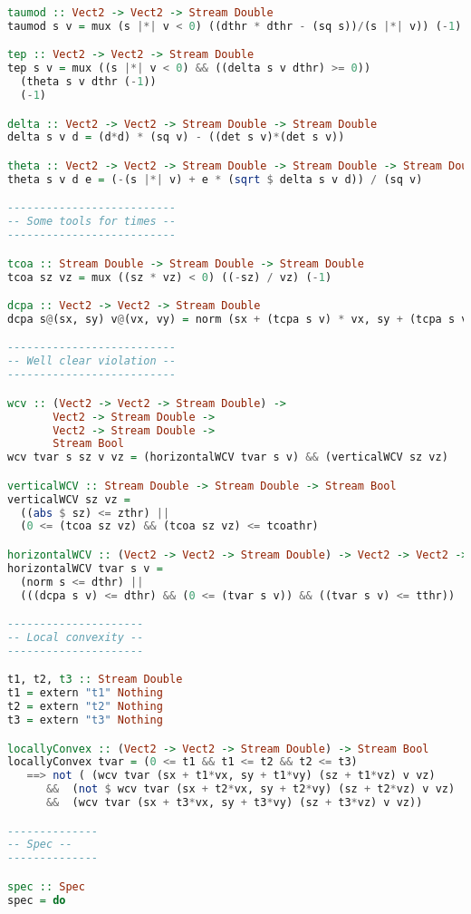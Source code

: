 {\begin{lstlisting}[language=Haskell]
taumod :: Vect2 -> Vect2 -> Stream Double
taumod s v = mux (s |*| v < 0) ((dthr * dthr - (sq s))/(s |*| v)) (-1)

tep :: Vect2 -> Vect2 -> Stream Double
tep s v = mux ((s |*| v < 0) && ((delta s v dthr) >= 0))
  (theta s v dthr (-1))
  (-1)

delta :: Vect2 -> Vect2 -> Stream Double -> Stream Double
delta s v d = (d*d) * (sq v) - ((det s v)*(det s v))

theta :: Vect2 -> Vect2 -> Stream Double -> Stream Double -> Stream Double
theta s v d e = (-(s |*| v) + e * (sqrt $ delta s v d)) / (sq v)

--------------------------
-- Some tools for times --
--------------------------

tcoa :: Stream Double -> Stream Double -> Stream Double
tcoa sz vz = mux ((sz * vz) < 0) ((-sz) / vz) (-1)

dcpa :: Vect2 -> Vect2 -> Stream Double
dcpa s@(sx, sy) v@(vx, vy) = norm (sx + (tcpa s v) * vx, sy + (tcpa s v) * vy)

--------------------------
-- Well clear violation --
--------------------------

wcv :: (Vect2 -> Vect2 -> Stream Double) ->
       Vect2 -> Stream Double ->
       Vect2 -> Stream Double ->
       Stream Bool
wcv tvar s sz v vz = (horizontalWCV tvar s v) && (verticalWCV sz vz)

verticalWCV :: Stream Double -> Stream Double -> Stream Bool
verticalWCV sz vz =
  ((abs $ sz) <= zthr) ||
  (0 <= (tcoa sz vz) && (tcoa sz vz) <= tcoathr)

horizontalWCV :: (Vect2 -> Vect2 -> Stream Double) -> Vect2 -> Vect2 -> Stream Bool
horizontalWCV tvar s v =
  (norm s <= dthr) ||
  (((dcpa s v) <= dthr) && (0 <= (tvar s v)) && ((tvar s v) <= tthr))

---------------------
-- Local convexity --
---------------------

t1, t2, t3 :: Stream Double
t1 = extern "t1" Nothing
t2 = extern "t2" Nothing
t3 = extern "t3" Nothing

locallyConvex :: (Vect2 -> Vect2 -> Stream Double) -> Stream Bool
locallyConvex tvar = (0 <= t1 && t1 <= t2 && t2 <= t3)
   ==> not ( (wcv tvar (sx + t1*vx, sy + t1*vy) (sz + t1*vz) v vz)
      &&  (not $ wcv tvar (sx + t2*vx, sy + t2*vy) (sz + t2*vz) v vz)
      &&  (wcv tvar (sx + t3*vx, sy + t3*vy) (sz + t3*vz) v vz))

--------------
-- Spec --
--------------

spec :: Spec
spec = do


\end{lstlisting}}
